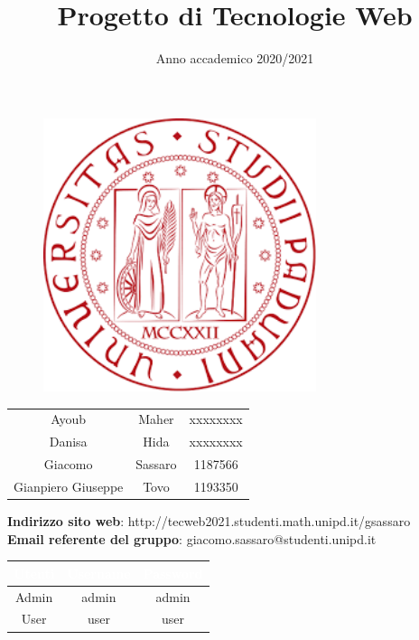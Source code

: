 \documentclass[12pt,a4paper]{article}
\title{Progetto di Tecnologie Web}
\author{}
\date{Anno accademico 2020/2021}
\begin{document}
\maketitle
\begin{figure}[H]
	\centering
	\includegraphics[width=8cm]{utility/logo.png}
\end{figure}
\begin{table}[H]
	\centering
	\renewcommand{\arraystretch}{2}
	\begin{longtable}{c c c}
		\rowcolor{green}\multicolumn{3}{c }{\textcolor{white}{\textbf{Componenti}}}\\
		\endhead
		 Ayoub & Maher & xxxxxxxx \\
		 Danisa & Hida & xxxxxxxx \\
		 Giacomo & Sassaro & 1187566 \\
		 Gianpiero Giuseppe & Tovo & 1193350 \\
	\end{longtable}
\end{table}

\begin{center}
	\textbf{Indirizzo sito web}: http://tecweb2021.studenti.math.unipd.it/gsassaro\\
	\textbf{Email referente del gruppo}: giacomo.sassaro@studenti.unipd.it
\end{center}

\begin{table}[H]
	\centering
	\renewcommand{\arraystretch}{2}
	\begin{longtable}{c | c c}
		\rowcolor{green}\textcolor{white}{\textbf{Utenti}} & \textcolor{white}{\textbf{Username}} & \textcolor{white}{\textbf{Password}}\\
		\endhead
		Admin & admin & admin\\
		User & user  & user \\
	\end{longtable}
\end{table}
\newpage
{}
\tableofcontents
\newpage

\newpage

\newpage

\newpage

\newpage

\end{document}
